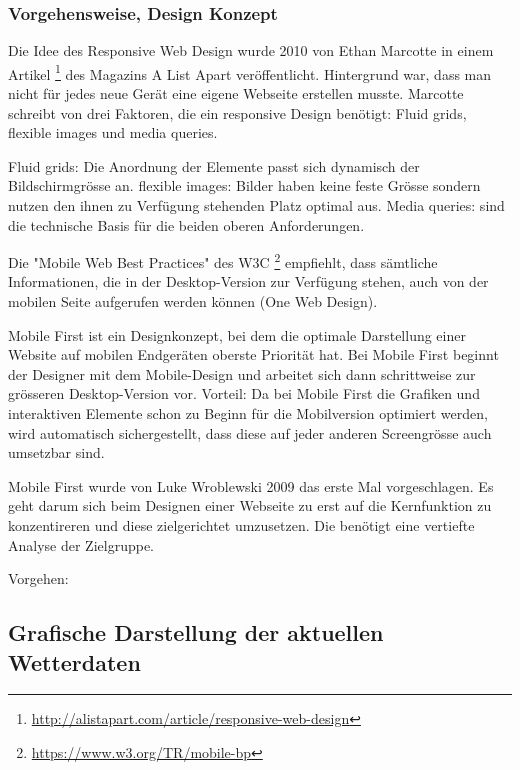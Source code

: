 \subsubsection{Vorgehensweise, Design Konzept}
\newline

Die Idee des Responsive Web Design wurde 2010 von Ethan Marcotte in einem Artikel \footnote{ \url{http://alistapart.com/article/responsive-web-design}} des Magazins A List Apart veröffentlicht. Hintergrund war, dass man nicht für jedes neue Gerät eine eigene Webseite erstellen musste. Marcotte schreibt von drei Faktoren, die ein responsive Design benötigt: Fluid grids, flexible images und media queries.

Fluid grids: Die Anordnung der Elemente passt sich dynamisch der Bildschirmgrösse an.
flexible images: Bilder haben keine feste Grösse sondern nutzen den ihnen zu Verfügung stehenden Platz optimal aus.
Media queries: sind die technische Basis für die beiden oberen Anforderungen.

Die "Mobile Web Best Practices" des W3C \footnote{ \url{https://www.w3.org/TR/mobile-bp}} empfiehlt, dass sämtliche Informationen, die in der Desktop-Version zur Verfügung stehen, auch von der mobilen Seite aufgerufen werden können (One Web Design).

Mobile First ist ein Designkonzept, bei dem die optimale Darstellung einer Website auf mobilen Endgeräten oberste Priorität hat. Bei Mobile First beginnt der Designer mit dem Mobile-Design und arbeitet sich dann schrittweise zur grösseren Desktop-Version vor. Vorteil: Da bei Mobile First die Grafiken und interaktiven Elemente schon zu Beginn für die Mobilversion optimiert werden, wird automatisch sichergestellt, dass diese auf jeder anderen Screengrösse auch umsetzbar sind.

Mobile First wurde von Luke Wroblewski 2009 das erste Mal vorgeschlagen. Es geht darum sich beim Designen einer Webseite zu erst auf die Kernfunktion zu konzentireren und diese zielgerichtet umzusetzen. Die benötigt eine vertiefte Analyse der Zielgruppe.

Vorgehen:






\subsection{Grafische Darstellung der aktuellen Wetterdaten}
\newline
{}\newline
{}\newline
{}\newline



